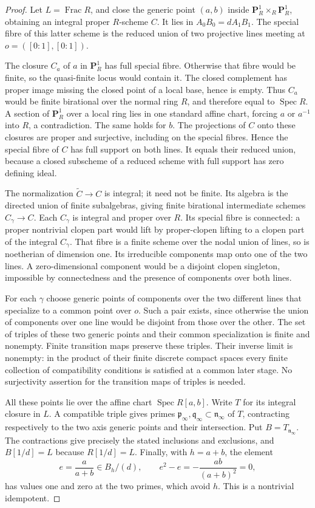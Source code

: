 \documentclass[11pt,a4paper]{article}
\theoremstyle{definition}
\newcommand{\Spec}{\operatorname{Spec}}
\begin{document}
\begin{proof}
Let $L=\operatorname{Frac}R$, and close the generic point $(a,b)$ inside $\mathbf P^1_R\times_R\mathbf P^1_R$, obtaining an integral proper $R$-scheme $C$. It lies in $A_0B_0=dA_1B_1$. The special fibre of this latter scheme is the reduced union of two projective lines meeting at $o=([0:1],[0:1])$.

The closure $C_a$ of $a$ in $\mathbf P^1_R$ has full special fibre. Otherwise that fibre would be finite, so the quasi-finite locus would contain it. The closed complement has proper image missing the closed point of a local base, hence is empty. Thus $C_a$ would be finite birational over the normal ring $R$, and therefore equal to $\Spec R$. A section of $\mathbf P^1_R$ over a local ring lies in one standard affine chart, forcing $a$ or $a^{-1}$ into $R$, a contradiction. The same holds for $b$. The projections of $C$ onto these closures are proper and surjective, including on the special fibres. Hence the special fibre of $C$ has full support on both lines. It equals their reduced union, because a closed subscheme of a reduced scheme with full support has zero defining ideal.

The normalization $\widetilde C\to C$ is integral; it need not be finite. Its algebra is the directed union of finite subalgebras, giving finite birational intermediate schemes $C_\gamma\to C$. Each $C_\gamma$ is integral and proper over $R$. Its special fibre is connected: a proper nontrivial clopen part would lift by proper-clopen lifting to a clopen part of the integral $C_\gamma$. That fibre is a finite scheme over the nodal union of lines, so is noetherian of dimension one. Its irreducible components map onto one of the two lines. A zero-dimensional component would be a disjoint clopen singleton, impossible by connectedness and the presence of components over both lines.

For each $\gamma$ choose generic points of components over the two different lines that specialize to a common point over $o$. Such a pair exists, since otherwise the union of components over one line would be disjoint from those over the other. The set of triples of these two generic points and their common specialization is finite and nonempty. Finite transition maps preserve these triples. Their inverse limit is nonempty: in the product of their finite discrete compact spaces every finite collection of compatibility conditions is satisfied at a common later stage. No surjectivity assertion for the transition maps of triples is needed.

All these points lie over the affine chart $\Spec R[a,b]$. Write $T$ for its integral closure in $L$. A compatible triple gives primes $\mathfrak p_\infty,\mathfrak q_\infty\subset\mathfrak n_\infty$ of $T$, contracting respectively to the two axis generic points and their intersection. Put $B=T_{\mathfrak n_\infty}$. The contractions give precisely the stated inclusions and exclusions, and $B[1/d]=L$ because $R[1/d]=L$. Finally, with $h=a+b$, the element
\[
 e=\frac a{a+b}\in B_h/(d),\qquad
 e^2-e=-\frac{ab}{(a+b)^2}=0,
\]
has values one and zero at the two primes, which avoid $h$. This is a nontrivial idempotent.
\end{proof}
\end{document}
